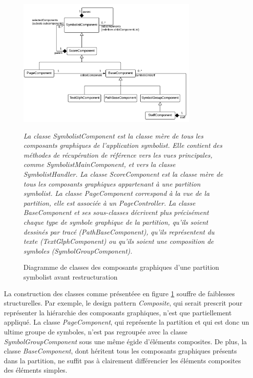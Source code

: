 \begin{figure}[H]
	\centering
	\includegraphics[keepaspectratio=true, width=0.8\textwidth]{ArchitectureLogicielle/i/graphicCompBefore.png}
	\caption{Diagramme de classes des composants graphiques d'une partition symbolist avant restructuration}
	\label{fig:graphicCompBefore}
	\small
	\it
	La classe \emph{SymbolistComponent} est la classe mère de tous les composants graphiques de l'application \emph{symbolist}. Elle contient des méthodes de récupération de référence vers les vues principales, comme \emph{SymbolistMainComponent}, et vers la classe \emph{SymbolistHandler}.
	La classe \emph{ScoreComponent} est la classe mère de tous les composants graphiques appartenant à une partition \emph{symbolist}.
	La classe \emph{PageComponent} correspond à la vue de la partition, elle est associée à un \emph{PageController}.
	La classe \emph{BaseComponent} et ses sous-classes décrivent plus précisément chaque type de symbole graphique de la partition, qu'ils soient dessinés par tracé (\emph{PathBaseComponent}), qu'ils représentent du texte (\emph{TextGlphComponent}) ou qu'ils soient une composition de symboles
	(SymbolGroupComponent).
\end{figure}

La construction des classes comme présentéee en figure \ref{fig:graphicCompBefore} souffre de faiblesses structurelles. Par exemple, le design pattern \textit{Composite}, qui serait prescrit pour représenter la hiérarchie des composants graphiques, n'est que partiellement appliqué.
La classe \textit{PageComponent}, qui représente la partition et qui est donc un ultime groupe de symboles, n'est pas regroupée avec la classe \textit{SymbolGroupComponent} sous une même égide d'éléments composites.
De plus, la classe \textit{BaseComponent}, dont héritent tous les composants graphiques présents dans la partition, ne suffit pas à clairement différencier les éléments composites des éléments simples.

